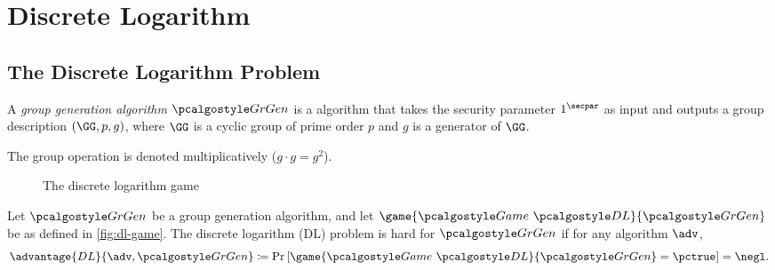 \section{Discrete Logarithm}\label{sec:discrete-log}

\subsection{The Discrete Logarithm Problem}

\begin{definition}
  A \emph{group generation algorithm} $\grgen$ is a \ppt algorithm that takes the security parameter $1^\secpar$ as input and outputs a group description $(\GG, p, g)$, where $\GG$ is a cyclic group of prime order $p$ and $g$ is a generator of $\GG$.
\end{definition}

\begin{remark}
  The group operation is denoted multiplicatively ($g\cdot g = g^2$).
\end{remark}


\begin{figure}[tbhp]
  \begin{center}
    \begin{tcolorbox}[width=5cm]
      \begin{pchstack}[center]
      \end{pchstack}
    \end{tcolorbox}
  \end{center}
  \caption{The discrete logarithm game\label{fig:dl-game}}
\end{figure}

\begin{definition}
  Let $\grgen$ be a group generation algorithm, and let $\game{\Game~\algo{DL}}{\grgen}$ be as defined in \autoref{fig:dl-game}.
  The discrete logarithm (DL) problem is hard for $\grgen$ if for any \ppt algorithm $\adv$,
  \[
  \advantage{DL}{\adv, \grgen} \defeq \pr{\game{\Game~\algo{DL}}{\grgen} = \pctrue} = \negl.
  \]
\end{definition}

